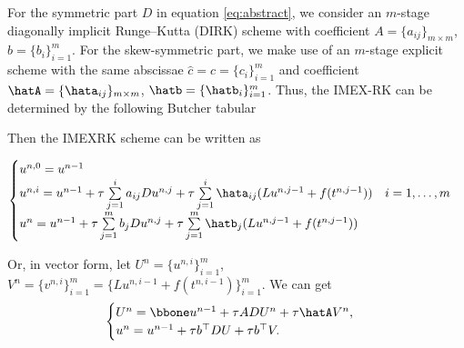 For the symmetric part $D$ in equation \eqref{eq:abstract},
we consider an $m$-stage diagonally implicit Runge--Kutta (DIRK) scheme
with coefficient $A = \{a_{ij}\}_{m\times m}$, $b = \{b_{i}\}_{i=1}^m$.
For the skew-symmetric part, we make use of an $m$-stage explicit scheme
with the same abscissae $\hat{c}=c = \{c_i\}_{i=1}^m$
and coefficient $\hatA = \{\hata_{ij}\}_{m\times m}$, $\hatb = \{\hatb_{i}\}_{i=1}^m$.
Thus, the IMEX-RK can be determined by the following Butcher tabular



Then the IMEXRK scheme can be written as

\begin{equation} \label{eq:imex}
    \begin{cases}
        u^{n,0} = u^{n-1}\\
        u^{n,i} = u^{n-1} + \tau \sum\limits_{j=1}^ia_{ij}Du^{n,j} + \tau \sum\limits_{j=1}^i\hata_{ij}(Lu^{n,j-1}+f(t^{n, j-1})) \quad i = 1, \dots, m\\
        u^n = u^{n-1} + \tau \sum\limits_{j=1}^m b_jDu^{n,j} + \tau \sum\limits_{j=1}^m \hatb_j(Lu^{n,j-1}+f(t^{n, j-1})) \\
    \end{cases}
\end{equation}

Or, in vector form, let $U^n = \{u^{n,i}\}_{i=1}^m$,
$V^n =  \{v^{n,i}\}_{i=1}^m =  \{Lu^{n,i-1}+f(t^{n,i-1})\}_{i=1}^m$.
We can get
\begin{equation} \label{eq:ImexVec}
    \begin{cases}
        U^n = \bbone u^{n-1} + \tau A DU^n + \tau \hatA V^n,\\
        u^n = u^{n-1} + \tau b^\top D U + \tau b^\top V.
    \end{cases}
\end{equation}

